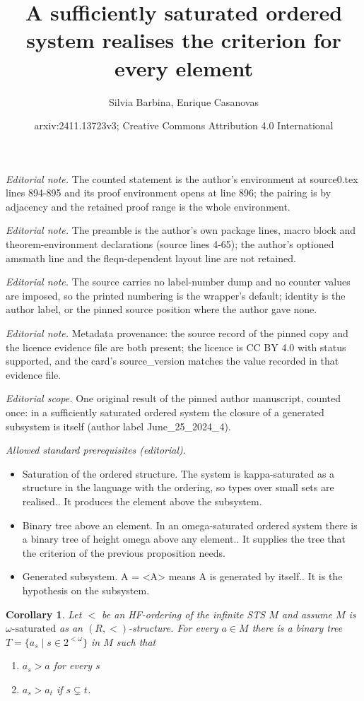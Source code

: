 \documentclass[10pt,a4paper]{article}
\title{A sufficiently saturated ordered system realises the criterion for every element}
\author{Silvia Barbina, Enrique Casanovas}
\date{arxiv:2411.13723v3; Creative Commons Attribution 4.0 International}
\theoremstyle{note}
\newtheorem{cor}[thm]{Corollary}
\begin{document}
\maketitle
\noindent\textit{Editorial note.} The counted statement is the author's environment at source0.tex lines 894-895 and its proof environment opens at line 896; the pairing is by adjacency and the retained proof range is the whole environment.\par\medskip
\noindent\textit{Editorial note.} The preamble is the author's own package lines, macro block and theorem-environment declarations (source lines 4-65); the author's optioned amsmath line and the fleqn-dependent layout line are not retained.\par\medskip
\noindent\textit{Editorial note.} The source carries no label-number dump and no counter values are imposed, so the printed numbering is the wrapper's default; identity is the author label, or the pinned source position where the author gave none.\par\medskip
\noindent\textit{Editorial note.} Metadata provenance: the source record of the pinned copy and the licence evidence file are both present; the licence is CC BY 4.0 with status supported, and the card's source\_version matches the value recorded in that evidence file.\par\medskip
\noindent\textit{Editorial scope.} One original result of the pinned author manuscript, counted once: in a sufficiently saturated ordered system the closure of a generated subsystem is itself (author label June\_25\_2024\_4).\par\medskip
\noindent\textit{Allowed standard prerequisites (editorial).}\begin{itemize}
\item Saturation of the ordered structure. The system is kappa-saturated as a structure in the language with the ordering, so types over small sets are realised.. It produces the element above the subsystem.
\item Binary tree above an element. In an omega-saturated ordered system there is a binary tree of height omega above any element.. It supplies the tree that the criterion of the previous proposition needs.
\item Generated subsystem. A = <A> means A is generated by itself.. It is the hypothesis on the subsystem.
\end{itemize}\medskip
\begin{cor}\label{tree4}
	Let $<$ be an HF-ordering of the infinite STS $M$ and assume %
	$M$ is $\text{$\omega$-saturated}$ as an $(R, <)$-structure.  For every $a\in M$    there is a binary tree $T=\{a_s\mid s\in 2^{<\omega}\}$  in $M$ such that
	\begin{enumerate}
		\item $a_s>a$  for every $s$
		\item $a_s>a_t$  if  $s\subsetneq t$.
	\end{enumerate}
\end{cor}
\end{document}
